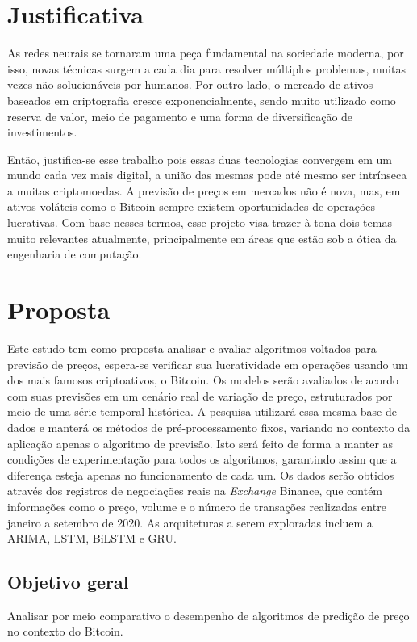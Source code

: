 \section{Justificativa}
As redes neurais se tornaram uma peça fundamental na sociedade moderna,
por isso, novas técnicas surgem a cada dia para resolver múltiplos problemas, 
muitas vezes não solucionáveis por humanos.
Por outro lado, o mercado de ativos baseados em criptografia cresce exponencialmente, 
sendo muito utilizado como reserva de valor, meio de pagamento e uma forma de diversificação de investimentos.

Então, justifica-se esse trabalho pois essas duas tecnologias convergem
em um mundo cada vez mais digital, a união das mesmas pode até mesmo ser intrínseca a muitas criptomoedas.
A previsão de preços em mercados não é nova, mas, em ativos voláteis como o Bitcoin sempre existem oportunidades de operações lucrativas. 
Com base nesses termos, esse projeto visa trazer à tona dois temas muito relevantes atualmente, principalmente em áreas que estão sob a ótica da engenharia de computação.


\section{Proposta}

Este estudo tem como proposta analisar e avaliar algoritmos voltados para previsão de preços, espera-se verificar sua lucratividade em operações usando um dos mais famosos criptoativos, o Bitcoin.
Os modelos serão avaliados de acordo com suas previsões em um cenário real de variação de preço, estruturados por meio de uma série temporal histórica. A pesquisa utilizará essa mesma base de dados e manterá os métodos de pré-processamento fixos, variando no contexto da aplicação apenas o algoritmo de previsão.
Isto será feito de forma a manter as condições de experimentação para todos os algoritmos, garantindo assim que a diferença esteja apenas no funcionamento de cada um.
Os dados serão obtidos através dos registros de negociações reais na \textit{Exchange}
 Binance, que contém informações como o preço, volume e o número de transações realizadas entre janeiro a setembro de 2020.
As arquiteturas a serem exploradas incluem a ARIMA, LSTM, BiLSTM e GRU.

\subsection{Objetivo geral}

Analisar por meio comparativo o desempenho de algoritmos de predição de preço no contexto do Bitcoin.

